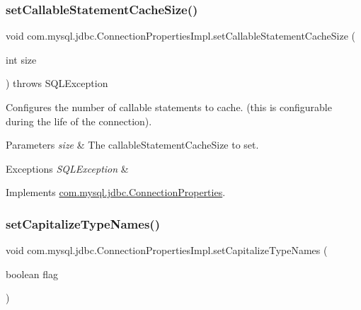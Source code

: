 \subsubsection{\texorpdfstring{set\+Callable\+Statement\+Cache\+Size()}{setCallableStatementCacheSize()}}
{\footnotesize\ttfamily void com.\+mysql.\+jdbc.\+Connection\+Properties\+Impl.\+set\+Callable\+Statement\+Cache\+Size (\begin{DoxyParamCaption}\item[{int}]{size }\end{DoxyParamCaption}) throws S\+Q\+L\+Exception}

Configures the number of callable statements to cache. (this is configurable during the life of the connection).


\begin{DoxyParams}{Parameters}
{\em size} & The callable\+Statement\+Cache\+Size to set. \\
\hline
\end{DoxyParams}

\begin{DoxyExceptions}{Exceptions}
{\em S\+Q\+L\+Exception} & \\
\hline
\end{DoxyExceptions}


Implements \mbox{\hyperlink{interfacecom_1_1mysql_1_1jdbc_1_1_connection_properties_ab22fc3c53b2a21bf9064036222219e22}{com.\+mysql.\+jdbc.\+Connection\+Properties}}.

\mbox{\label{classcom_1_1mysql_1_1jdbc_1_1_connection_properties_impl_a4a84837603364f439b6129daaf0dc80d}} 
\subsubsection{\texorpdfstring{set\+Capitalize\+Type\+Names()}{setCapitalizeTypeNames()}}
{\footnotesize\ttfamily void com.\+mysql.\+jdbc.\+Connection\+Properties\+Impl.\+set\+Capitalize\+Type\+Names (\begin{DoxyParamCaption}\item[{boolean}]{flag }\end{DoxyParamCaption})}


